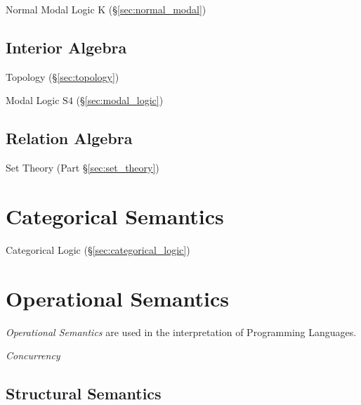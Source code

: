 Normal Modal Logic $\mathrm{K}$ (\S\ref{sec:normal_modal})



\subsection{Interior Algebra}\label{sec:interior_algebra}

Topology (\S\ref{sec:topology})

Modal Logic $\mathrm{S4}$ (\S\ref{sec:modal_logic})



\subsection{Relation Algebra}\label{sec:relation_algebra}

Set Theory (Part \S\ref{sec:set_theory})



\section{Categorical Semantics}\label{sec:categorical_semantics}

Categorical Logic (\S\ref{sec:categorical_logic})



\section{Operational Semantics}\label{sec:operational_semantics}

\emph{Operational Semantics} are used in the interpretation of
Programming Languages.

\emph{Concurrency}



\subsection{Structural Semantics}\label{sec:structural_semantics}

